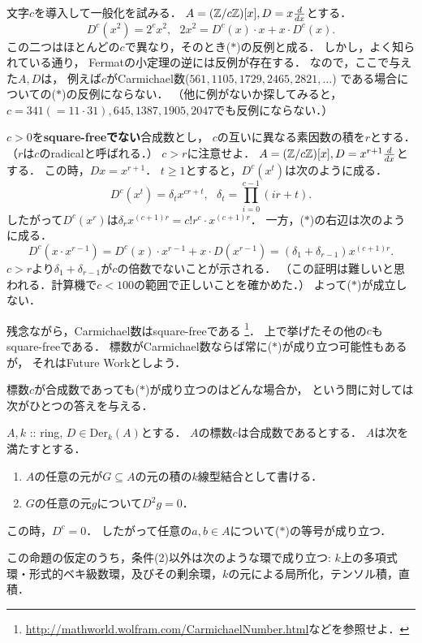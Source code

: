 \documentclass[a4paper]{jsarticle}
\newcommand{\Der}{\mathrm{Der}}
\begin{document}
\begin{Example}
    文字$c$を導入して一般化を試みる．
    $A=(\mathbb{Z}/c\mathbb{Z})[x], D=x \frac{d}{dx}$とする．
    \[ D^c(x^2)=2^c x^2,~~~ 2x^2=D^c(x) \cdot x+x \cdot D^c(x). \]
    この二つはほとんどの$c$で異なり，そのとき($*$)の反例と成る．
    しかし，よく知られている通り，
    Fermatの小定理の逆には反例が存在する．
    なので，ここで与えた$A,D$は，
    例えば$c$がCarmichael数($561, 1105, 1729, 2465, 2821, \dots$)
    である場合についての($*$)の反例にならない．
    （他に例がないか探してみると，$c=341(=11 \cdot 31), 645, 1387, 1905, 2047$でも反例にならない．）
\end{Example}

\begin{Example}
    $c>0$を\textbf{square-freeでない}合成数とし，
    $c$の互いに異なる素因数の積を$r$とする．
    （$r$は$c$のradicalと呼ばれる．）
    $c > r$に注意せよ．
    $A=(\mathbb{Z}/c\mathbb{Z})[x], D=x^{r+1} \frac{d}{dx}$とする．
    この時，$Dx=x^{r+1}$．
    $t \geq 1$とすると，$D^c(x^t)$は次のように成る．
    \[ D^c(x^t)=\delta_t x^{cr+t},~~~ \delta_t=\prod_{i=0}^{c-1}(ir+t). \]
    したがって$D^c(x^r)$は$\delta_r x^{(c+1)r}=c! r^c \cdot x^{(c+1)r}$．
    一方，($*$)の右辺は次のように成る．
    \[ D^c(x \cdot x^{r-1})=D^c(x) \cdot x^{r-1}+x \cdot D(x^{r-1})=(\delta_1+\delta_{r-1}) x^{(c+1)r}. \]
    $c>r$より$\delta_1+\delta_{r-1}$が$c$の倍数でないことが示される．
    （この証明は難しいと思われる．計算機で$c<100$の範囲で正しいことを確かめた．）
    よって($*$)が成立しない．
\end{Example}
残念ながら，Carmichael数はsquare-freeである
\footnote{\url{http://mathworld.wolfram.com/CarmichaelNumber.html}などを参照せよ．}．
上で挙げたその他の$c$もsquare-freeである．
標数がCarmichael数ならば常に($*$)が成り立つ可能性もあるが，
それはFuture Workとしよう．

標数$c$が合成数であっても($*$)が成り立つのはどんな場合か，
という問に対しては次がひとつの答えを与える．
\begin{Prop}
    $A, k$ :: ring, $D \in \Der_k(A)$とする．
    $A$の標数$c$は合成数であるとする．
    $A$は次を満たすとする．
    \begin{enumerate}[label=(\arabic*)]
        \item $A$の任意の元が$G \subseteq A$の元の積の$k$線型結合として書ける．
        \item $G$の任意の元$g$について$D^2g=0$．
    \end{enumerate}
    この時，$D^c=0$．
    したがって任意の$a,b \in A$について($*$)の等号が成り立つ．
\end{Prop}
この命題の仮定のうち，条件(2)以外は次のような環で成り立つ:
$k$上の多項式環・形式的ベキ級数環，及びその剰余環，$k$の元による局所化，テンソル積，直積．
\end{document}
